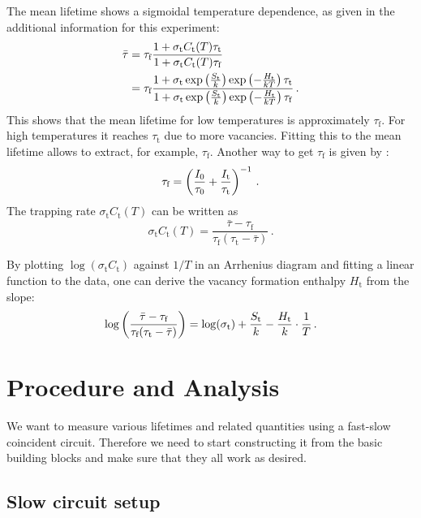 \documentclass[11pt, english, fleqn, DIV=15, headinclude, BCOR=2cm]{scrreprt}
\begin{document}
The mean lifetime shows a sigmoidal temperature dependence, as given in the
additional information for this experiment:
\begin{align}
    \nonumber
    \bar\tau &= \tau_\text{f} \frac{1 + \sigma_\text{t} C_\text{t}(T) \tau_\text{t}}{1 +
    \sigma_\text{t} C_\text{t}(T) \tau_\text{f}} \\
    \label{eq:temp-model}
    &= \tau_\text{f} \frac{1 + \sigma_\text{t} \exp\left( \frac{S_\text{t}}{k} \right)
        \exp\left( -\frac{H_\mathrm t}{kT} \right) \tau_\text{t}} {1 + \sigma_\text{t}
        \exp\left( \frac{S_\text{t}}{k} \right) \exp\left( -\frac{H_\mathrm t}{kT} \right)
\tau_\text{f}} \,.
\end{align}
This shows that the mean lifetime for low temperatures is
approximately $\tau_\text{f}$. For high temperatures it reaches
$\tau_\text{t}$ due to more vacancies. Fitting this to the
mean lifetime allows to extract, for example, $\tau_\text{f}$. 
Another way to get $\tau_\text{f}$ is given by
\textcite[(6)]{Weiler/Vacancy_formation}:
\[
    \tau_\text{f} = \left( \frac{I_0}{\tau_0} +
    \frac{I_\text{t}}{\tau_\text{t}} \right)^{-1} \,.
\]
The trapping rate $\sigma_\text{t} C_\text{t}(T)$ can be written as
\[
        \sigma_\text{t} C_\text{t}(T) = \frac{\bar\tau - \tau_\text{f}}
    {\tau_\text{f}(\tau_\text{t}-\bar\tau)} \,.
\]

By plotting $\log(\sigma_\text{t} C_\text{t})$ against $1/T$ in an Arrhenius
diagram and fitting a linear function to the data, one can
derive the vacancy formation enthalpy $H_\text{t}$ from the
slope:
\begin{equation}
    \label{eq:arrhenius}
    \log\left( \frac{\bar\tau - \tau_\text{f}}
    {\tau_\text{f}(\tau_\text{t}-\bar\tau)} \right) = \log(\sigma_\text{t}) +
    \frac{S_\text{t}}k - \frac{H_\text{t}}{k}\cdot\frac1T \,.
\end{equation}


\chapter{Procedure and Analysis}

We want to measure various lifetimes and related quantities using a fast-slow
coincident circuit. Therefore we need to start constructing it from the basic
building blocks and make sure that they all work as desired.

\section{Slow circuit setup}
\end{document}
